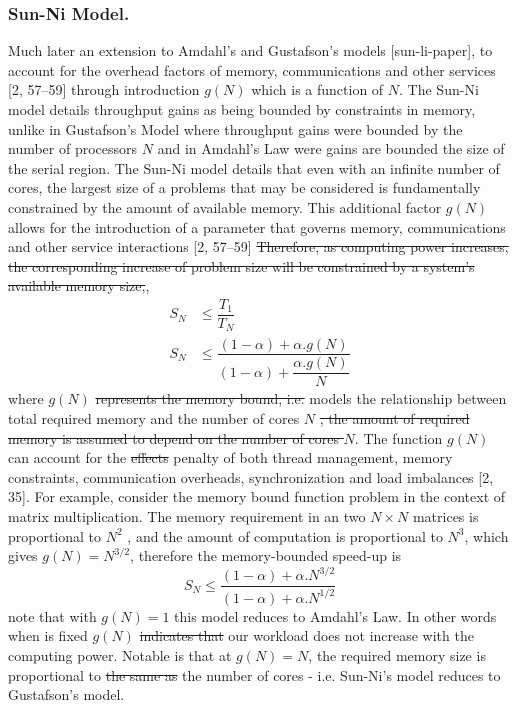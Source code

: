 \documentclass[10pt]{article}[draft]
\begin{document}
\subsubsection{Sun-Ni Model.}
Much later an extension to Amdahl's  and Gustafson's models [sun-li-paper],
to account for the overhead factors of memory, communications and other services [2, 57–59] through introduction $g(N)$ which is a function of $N$. The Sun-Ni model details throughput gains as  being bounded by constraints in memory, \cite{sun-ni} unlike in Gustafson's Model where throughput gains  were bounded by the number of processors $N$ and in Amdahl's Law were gains are bounded the size of the serial region. The Sun-Ni model details that even with an infinite number of cores, the largest size of a problems that may be considered is fundamentally constrained by the amount of available memory. This additional factor $g(N)$ allows for the introduction of a parameter that governs memory, communications and other service interactions [2, 57–59] \st{Therefore, as computing power increases, the corresponding increase of problem size will be constrained by a system's available memory size,},
\begin{equation}
	\begin{split}
	S_N	& \leq \dfrac{T_1}{T_N} \\
	S_N	&  \leq \dfrac{(1 - \alpha) + \alpha.g(N)}{(1 - \alpha)+ \dfrac{\alpha.g(N)}{N}}  
	\end{split}
\end{equation}
where $g(N)$ \st{represents  the memory bound, i.e.} models the relationship between total required memory and the number of cores $N$ \st{, the amount of required memory is assumed to depend on the number of cores $N$}. The function $g(N)$ can account for the \st{effects}  penalty of both thread management, memory constraints, communication overheads, synchronization and load imbalances [2, 35].  For example, consider the memory bound function problem in the context of  matrix multiplication. The memory requirement in an  two $N \times N$ matrices is proportional to $N^2$ , and the amount of computation is proportional to $N^3$, which gives $g(N) = N^{3/2}$, therefore the memory-bounded speed-up is
\begin{equation}
\label{sunni_model}
S_N \leq \dfrac{(1 - \alpha) + \alpha.N^{3/2}}{(1 - \alpha)+ \alpha.N^{1/2}}
\end{equation}
note that with $g(N) = 1$ this model reduces to Amdahl’s Law. In other words when is fixed $g(N)$ \st{indicates that} our workload does not increase with the computing power. Notable is that at $g(N) = N$, the required memory size is proportional to \st{the same as} the number of cores - i.e. Sun-Ni's model reduces to Gustafson’s model. 
\end{document}
